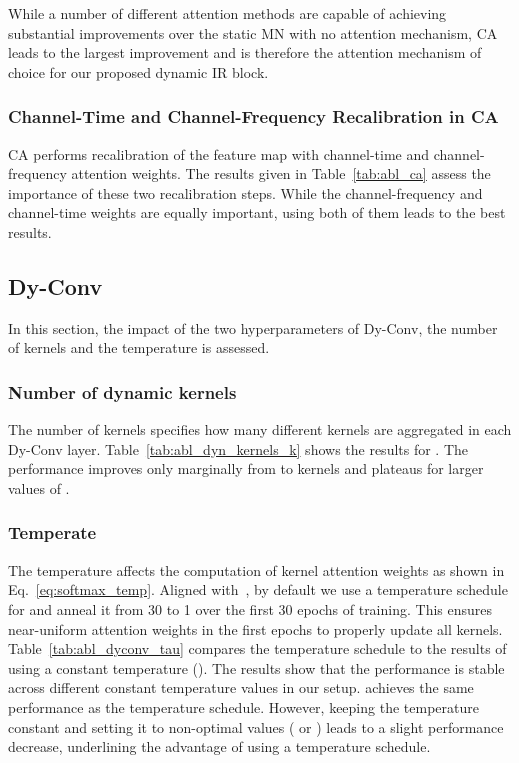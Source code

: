 \documentclass[lettersize,journal]{IEEEtran}
\begin{document}
While a number of different attention methods are capable of achieving substantial improvements over the static MN with no attention mechanism, CA leads to the largest improvement and is therefore the attention mechanism of choice for our proposed dynamic IR block.

\subsubsection{Channel-Time and Channel-Frequency Recalibration in CA} 

CA performs recalibration of the feature map with channel-time and channel-frequency attention weights. The results given in Table~\ref{tab:abl_ca} assess the importance of these two recalibration steps. While the channel-frequency and channel-time weights are equally important, using both of them leads to the best results.


\subsection{Dy-Conv}
\label{subsec:abl_dyconv}

In this section, the impact of the two hyperparameters of Dy-Conv, the number of kernels  and the temperature  is assessed.

\subsubsection{Number of dynamic kernels }

The number of kernels  specifies how many different kernels are aggregated in each Dy-Conv layer. Table~\ref{tab:abl_dyn_kernels_k} shows the results for . The performance improves only marginally from  to  kernels and plateaus for larger values of .

\subsubsection{Temperate }

The temperature  affects the computation of kernel attention weights as shown in Eq.~\ref{eq:softmax_temp}. 
Aligned with~\cite{chen2020dynamic_conv}, by default we use a temperature schedule for  and anneal it from 30 to 1 over the first 30 epochs of training. This ensures near-uniform attention weights in the first epochs to properly update all kernels. Table~\ref{tab:abl_dyconv_tau} compares the temperature schedule to the results of using a constant temperature (). The results show that the performance is stable across different constant temperature values in our setup.  achieves the same performance as the temperature schedule. However, keeping the temperature constant and setting it to non-optimal values ( or ) leads to a slight performance decrease, underlining the advantage of using a temperature schedule.
\end{document}
